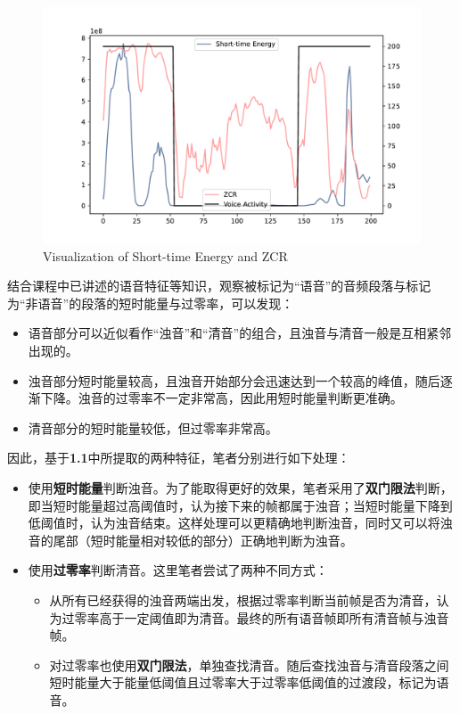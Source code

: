 \documentclass[a4paper]{article}
\begin{document}
\begin{figure}[htb]
  \hspace{-3.6em}
  \includegraphics[scale=0.5]{figs/voice_example.pdf}
  \caption{Visualization of Short-time Energy and ZCR}
  \label{fig1}
\end{figure}

结合课程中已讲述的语音特征等知识，观察被标记为“语音”的音频段落与标记为“非语音”的段落的短时能量与过零率，可以发现：

\begin{itemize}
    \item 语音部分可以近似看作“浊音”和“清音”的组合，且浊音与清音一般是互相紧邻出现的。
    \item 浊音部分短时能量较高，且浊音开始部分会迅速达到一个较高的峰值，随后逐渐下降。浊音的过零率不一定非常高，因此用短时能量判断更准确。
    \item 清音部分的短时能量较低，但过零率非常高。
\end{itemize}

因此，基于\textbf{1.1}中所提取的两种特征，笔者分别进行如下处理：

\begin{itemize}
    \item 使用\textbf{短时能量}判断浊音。为了能取得更好的效果，笔者采用了\textbf{双门限法}判断，即当短时能量超过高阈值时，认为接下来的帧都属于浊音；当短时能量下降到低阈值时，认为浊音结束。这样处理可以更精确地判断浊音，同时又可以将浊音的尾部（短时能量相对较低的部分）正确地判断为浊音。
    
    \item 使用\textbf{过零率}判断清音。这里笔者尝试了两种不同方式：
    \begin{itemize}
        \item 从所有已经获得的浊音两端出发，根据过零率判断当前帧是否为清音，认为过零率高于一定阈值即为清音。最终的所有语音帧即所有清音帧与浊音帧。
        \item 对过零率也使用\textbf{双门限法}，单独查找清音。随后查找浊音与清音段落之间短时能量大于能量低阈值且过零率大于过零率低阈值的过渡段，标记为语音。
    \end{itemize}
    
\end{itemize}
\end{document}
